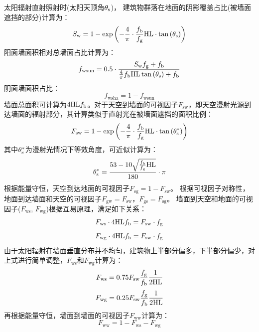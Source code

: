 太阳辐射直射照射时(太阳天顶角$\theta_{\rm s}$)，
建筑物群落在地面的阴影覆盖占比(被墙面遮挡的部分)计算为：
\begin{equation}\label{S_w}
  S_{\mathrm{w}}=1-\exp \left(-\frac{4}{\pi} \cdot \frac{f_{\mathrm{b}}}{f_{\mathrm{g}}} {\rm HL} \cdot \tan \left(\theta_{\mathrm{s}}\right)\right)
\end{equation}
阳面墙面积相对总墙面占比计算为：
\begin{equation}\label{f_wsun}
  f_{\mathrm{wsun}}=0.5 \cdot \frac{S_{\mathrm{w}} f_{\mathrm{g}}+f_{\mathrm{b}}}{\frac{4}{\pi} f_{\mathrm{b}} {\rm HL} \tan \left(\theta_{\mathrm{s}}\right)+f_{\mathrm{b}}}
\end{equation}
阴面墙面积占比：
\begin{equation}\label{f_wsha}
  f_{\mathrm{wsha}}=1-f_{\mathrm{wsun}}
\end{equation}
墙面总面积可计算为$4{\rm HL}f_{\rm b}$。对于天空到墙面的可视因子$F_{\mathrm{sw}}$，即天空漫射光源到达墙面的辐射部分，其计算类似于直射光在被墙面遮挡的面积比例：
\begin{equation}\label{f_sw}
  F_{\mathrm{sw}}=1-\exp \left(-\frac{4}{\pi} \cdot \frac{f_{\mathrm{b}}}{f_{\mathrm{g}}} {\rm HL} \cdot \tan \left(\theta_{\mathrm{s}}^{*}\right)\right)
\end{equation}
其中$\theta_{\rm s}^\ast$为漫射光情况下等效角度，可近似计算为：
\begin{equation}
  \theta_{\mathrm{s}}^{*}=\frac{53-10 \sqrt{\frac{f_{\mathrm{b}}}{f_{\mathrm{g}}} {\rm HL}}}{180} \cdot \pi
\end{equation}
根据能量守恒，天空到达地面的可视因子$F_{\mathrm{sg}}=1-F_{\mathrm{sw}}$。
根据可视因子对称性，地面到达墙面和天空的可视因子$F_{\mathrm{gw}}=F_{\mathrm{sw}}$，$F_{\mathrm{gs}}=F_{\mathrm{sg}}$。
墙面到天空和地面的可视因子($F_{\mathrm{ws}}$, $F_{\mathrm{wg}}$)根据互易原理，满足如下关系：
\begin{equation}
  F_{\mathrm{ws}} \cdot 4 {\rm HL} f_{\mathrm{b}}=F_{\mathrm{s w}} \cdot f_{\mathrm{g}}
\end{equation}
\begin{equation}
  F_{\mathrm{wg}} \cdot 4 {\rm HL} f_{\mathrm{b}}=F_{\mathrm{s w}} \cdot f_{\mathrm{g}}
\end{equation}
由于太阳辐射在墙面垂直分布并不均匀，建筑物上半部分偏多，下半部分偏少，对上式进行简单调整，$F_{\mathrm{ws}}$和$F_{\mathrm{wg}}$计算为：
\begin{equation}
  F_{\mathrm{ws}}=0.75 F_{\mathrm{s w}} \frac{f_{\mathrm{g}}}{f_{\mathrm{b}}} \frac{1}{2 {\rm HL}}
\end{equation}
\begin{equation}
  F_{\mathrm{wg}}=0.25 F_{\mathrm{s w}} \frac{f_{\mathrm{g}}}{f_{\mathrm{b}}} \frac{1}{2 {\rm HL}}
\end{equation}
再根据能量守恒，墙面到墙面的可视因子$F_{\mathrm{ww}}$计算为：
\begin{equation}
  F_{\mathrm{ww}}=1-F_{\mathrm{ws}}-F_{\mathrm{wg}}
\end{equation}

